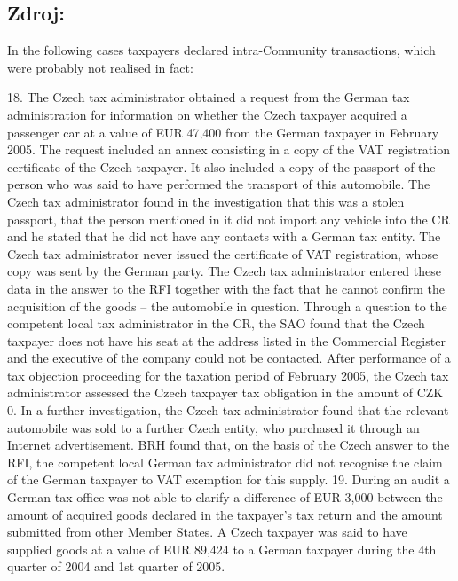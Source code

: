 \documentclass[10pt]{article}
\begin{document}
\subsection*{Zdroj:}



In the following cases taxpayers declared intra-Community transactions, which were probably not realised in fact:

18.
The Czech tax administrator obtained a request from the German tax administration for information on whether the Czech taxpayer acquired a passenger car at a value of EUR 47,400 from the German taxpayer in February 2005.
The request included an annex consisting in a copy of the VAT registration certificate of the Czech taxpayer.
It also included a copy of the passport of the person who was said to have performed the transport of this automobile.
The Czech tax administrator found in the investigation that this was a stolen passport, that the person mentioned in it did not import any vehicle into the CR and he stated that he did not have any contacts with a German tax entity.
The Czech tax administrator never issued the certificate of VAT registration, whose copy was sent by the German party.
The Czech tax administrator entered these data in the answer to the RFI together with the fact that he cannot confirm the acquisition of the goods – the automobile in question.
Through a question to the competent local tax administrator in the CR, the SAO found that the Czech taxpayer does not have his seat at the address listed in the Commercial Register and the executive of the company could not be contacted.
After performance of a tax objection proceeding for the taxation period of February 2005, the Czech tax administrator assessed the Czech taxpayer tax obligation in the amount of CZK 0.
In a further investigation, the Czech tax administrator found that the relevant automobile was sold to a further Czech entity, who purchased it through an Internet advertisement.
BRH found that, on the basis of the Czech answer to the RFI, the competent local German tax administrator did not recognise the claim of the German taxpayer to VAT exemption for this supply.
19. During an audit a German tax office was not able to clarify a difference of EUR 3,000 between the amount of acquired goods declared in the taxpayer’s tax return and the amount submitted from other Member States.
A Czech taxpayer was said to have supplied goods at a value of EUR 89,424 to a German taxpayer during the 4th quarter of 2004 and 1st quarter of 2005.
\end{document}
